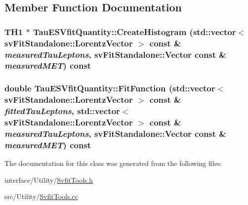 \subsection{Member Function Documentation}
\hypertarget{classTauESVfitQuantity_aa16a2c9b7e9c139df0048ea6e4fbd0aa}{
\subsubsection[{CreateHistogram}]{\setlength{\rightskip}{0pt plus 5cm}TH1 $\ast$ TauESVfitQuantity::CreateHistogram (std::vector$<$ svFitStandalone::LorentzVector $>$ const \& {\em measuredTauLeptons}, \/  svFitStandalone::Vector const \& {\em measuredMET}) const}}
\label{classTauESVfitQuantity_aa16a2c9b7e9c139df0048ea6e4fbd0aa}
\hypertarget{classTauESVfitQuantity_a6eb4d1ec1a95938a2bf038cb137cac94}{
\subsubsection[{FitFunction}]{\setlength{\rightskip}{0pt plus 5cm}double TauESVfitQuantity::FitFunction (std::vector$<$ svFitStandalone::LorentzVector $>$ const \& {\em fittedTauLeptons}, \/  std::vector$<$ svFitStandalone::LorentzVector $>$ const \& {\em measuredTauLeptons}, \/  svFitStandalone::Vector const \& {\em measuredMET}) const}}
\label{classTauESVfitQuantity_a6eb4d1ec1a95938a2bf038cb137cac94}


The documentation for this class was generated from the following files:\begin{DoxyCompactItemize}
\item 
interface/Utility/\hyperlink{SvfitTools_8h}{SvfitTools.h}\item 
src/Utility/\hyperlink{SvfitTools_8cc}{SvfitTools.cc}\end{DoxyCompactItemize}
